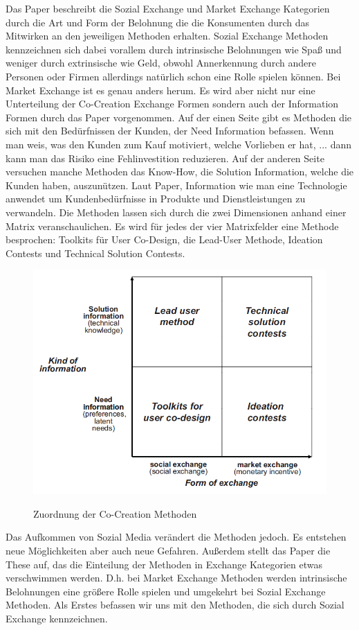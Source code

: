 Das Paper beschreibt die Sozial Exchange und Market Exchange Kategorien durch die Art und Form der Belohnung die die Konsumenten durch das Mitwirken an den jeweiligen Methoden erhalten. Sozial Exchange Methoden kennzeichnen sich dabei vorallem durch intrinsische Belohnungen wie Spa\ss{} und weniger durch extrinsische wie Geld, obwohl Annerkennung durch andere Personen oder Firmen allerdings nat\"urlich schon eine Rolle spielen k\"onnen. Bei Market Exchange ist es genau anders herum. Es wird aber nicht nur eine Unterteilung der Co-Creation Exchange Formen sondern auch der  Information Formen durch das Paper vorgenommen.
Auf der einen Seite gibt es Methoden die sich mit den Bed\"urfnissen der Kunden, der Need Information befassen. Wenn man weis, was den Kunden zum Kauf motiviert, welche Vorlieben er hat, ... dann kann man das Risiko eine Fehlinvestition reduzieren. Auf der anderen Seite versuchen manche Methoden das Know-How, die Solution Information, welche die Kunden haben, auszun\"utzen. Laut Paper, Information \glqq wie man eine Technologie anwendet um Kundenbed\"urfnisse in Produkte und Dienstleistungen zu verwandeln\grqq. Die Methoden lassen sich durch die zwei Dimensionen anhand einer Matrix veranschaulichen. Es wird f\"ur jedes der vier Matrixfelder eine Methode besprochen: Toolkits f\"ur User Co-Design, die Lead-User Methode, Ideation Contests und Technical Solution Contests.
\pagebreak
\begin{figure}[h!]
	\caption{Zuordnung der Co-Creation Methoden\cite{COCREATION}}
	\centering
		\includegraphics[scale=0.8]{figures/Co-Creation_Matrix}
	\label{quirkyInfluence}
\end{figure}
Das Aufkommen von Sozial Media ver\"andert die Methoden jedoch. Es entstehen neue M\"oglichkeiten aber auch neue Gefahren. Au\ss{}erdem stellt das Paper die These auf, das die Einteilung der Methoden in Exchange Kategorien etwas verschwimmen werden. D.h. bei Market Exchange Methoden werden intrinsische Belohnungen eine gr\"o\ss{}ere Rolle spielen und umgekehrt bei Sozial Exchange Methoden. Als Erstes befassen wir uns mit den Methoden, die sich durch Sozial Exchange kennzeichnen.